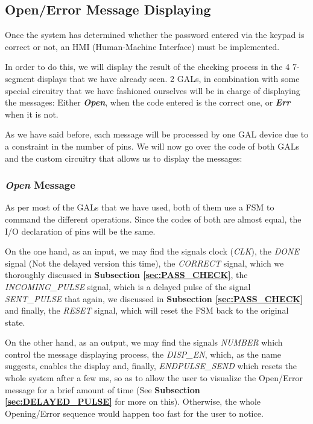 \subsection{Open/Error Message Displaying}
\label{sec:OPEN_ERROR}

Once the system has determined whether the password entered via the keypad is correct or not, an HMI (Human-Machine Interface) must be implemented. \medskip

In order to do this, we will display the result of the checking process in the 4 7-segment displays that we have already seen. 2 GALs, in combination with some special circuitry that we have fashioned ourselves will be in charge of displaying the messages: Either \textbf{\textit{Open}}, when the code entered is the correct one, or \textbf{\textit{Err}} when it is not.  

\medskip

As we have said before, each message will be processed by one GAL device due to a constraint in the number of pins. We will now go over the code of both GALs and the custom circuitry that allows us to display the messages: \medskip


\subsubsection{\textit{Open} Message}
\label{sec:OPEN_MESSAGE}

As per most of the GALs that we have used, both of them use a FSM to command the different operations. Since the codes of both are almost equal, the I/O declaration of pins will be the same. \medskip

On the one hand, as an input, we may find the signals clock (\textit{CLK}), the \textit{DONE} signal (Not the delayed version this time), the \textit{CORRECT} signal, which we thoroughly discussed in \textbf{Subsection \ref{sec:PASS_CHECK}}, the \textit{INCOMING\_PULSE} signal, which is a delayed pulse of the signal \textit{SENT\_PULSE} that again, we discussed in \textbf{Subsection \ref{sec:PASS_CHECK}} and finally, the \textit{RESET} signal, which will reset the FSM back to the original state. \medskip

On the other hand, as an output, we may find the signals \textit{NUMBER} which control the message displaying process, the \textit{DISP\_EN}, which, as the name suggests, enables the display and, finally, \textit{ENDPULSE\_SEND} which resets the whole system after a few ms, so as to allow the user to visualize the Open/Error message for a brief amount of time (See \textbf{Subsection \ref{sec:DELAYED_PULSE}} for more on this). Otherwise, the whole Opening/Error sequence would happen too fast for the user to notice.\medskip

